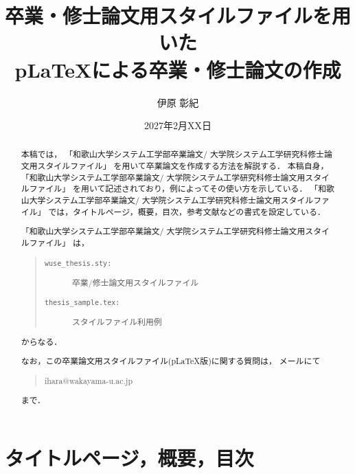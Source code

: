 \documentclass[11pt]{jreport}
\title{卒業・修士論文用スタイルファイルを用いた\\
       p\LaTeX による卒業・修士論文の作成}
\author{伊原 彰紀}
\date{2027年2月XX日}	%
\begin{document}
\maketitle

\begin{abstract}
本稿では，
「和歌山大学システム工学部卒業論文/
  大学院システム工学研究科修士論文用スタイルファイル」
を用いて卒業論文を作成する方法を解説する．
本稿自身，
「和歌山大学システム工学部卒業論文/
  大学院システム工学研究科修士論文用スタイルファイル」
を用いて記述されており，例によってその使い方を示している．
「和歌山大学システム工学部卒業論文/
  大学院システム工学研究科修士論文用スタイルファイル」
では，タイトルページ，概要，目次，参考文献などの書式を設定している．

「和歌山大学システム工学部卒業論文/
  大学院システム工学研究科修士論文用スタイルファイル」
は，
\begin{quote}
  \begin{description}
    \item[\tt wuse\_thesis.sty:] 卒業/修士論文用スタイルファイル
    \item[\tt thesis\_sample.tex:] スタイルファイル利用例
  \end{description}
\end{quote}
からなる．

なお，この卒業論文用スタイルファイル(p\LaTeX 版)に関する質問は，
メールにて
\begin{quote}
ihara@wakayama-u.ac.jp
\end{quote}
まで．

\end{abstract}

\tableofcontents



\newpage
{}	%



\chapter{タイトルページ，概要，目次}
\end{document}
